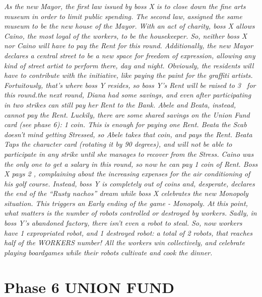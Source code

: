             \textit{As the new Mayor, the first law issued by boss X is to close down the fine arts museum
            in order to limit public spending. The second law, assigned the same museum
            to be the new house of the Mayor. With an act of charity, boss X allows Caino, the
            most loyal of the workers, to be the housekeeper. So, neither boss X nor Caino will
            have to pay the Rent for this round. Additionally, the new Mayor declares a central
            street to be a new space for freedom of expression, allowing any kind of street artist
            to perform there, day and night. Obviously, the residents will have to contribute
            with the initiative, like paying the paint for the graffiti artists. Fortuitously, that's
            where boss Y resides, so boss Y's Rent will be raised to 3 \faRubleSign\ for this round.\newline
            [...] the next round, Diana had some savings, and even after participating in two strikes
            can still pay her Rent to the Bank. Abele and Beata, instead, cannot pay the Rent. Luckily,
            there are some shared savings on the Union Fund card (see phase 6): 1 coin. This is
            enough for paying one Rent. Beata the Scab doesn't mind getting Stressed, so Abele takes
            that coin, and pays the Rent. Beata Taps the character card (rotating it by 90 degrees),
            and will not be able to participate in any strike until she manages to recover from the
            Stress. Caino was the only one to get a salary in this round, so now he can pay 1 coin of
            Rent. Boss X pays 2 \faRubleSign, complaining about the increasing expenses for the air conditioning
            of his golf course. Instead, boss Y is completely out of coins and, desperate, declares the
            end of the “Rusty nachos” dream while boss X celebrates the new Monopoly situation.
            This triggers an Early ending of the game - Monopoly. At this point, what matters is the
            number of robots controlled or destroyed by workers. Sadly, in boss Y's abandoned factory,
            there isn't even a robot to steal. So, now workers have 1 expropriated robot, and
            1 destroyed robot: a total of 2 robots, that reaches half of the WORKERS number! All the
            workers win collectively, and celebrate playing boardgames while their robots cultivate
            and cook the dinner.}



\section{Phase 6 UNION FUND}

